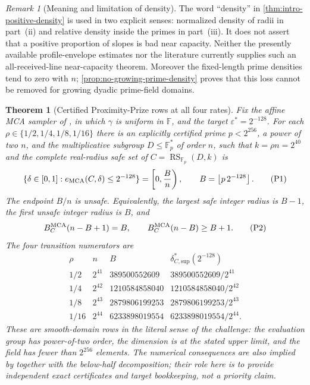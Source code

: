 \documentclass[11pt,a4paper]{amsart}
\numberwithin{equation}{section}
\newtheorem{theorem}{Theorem}[section]
\theoremstyle{remark}
\newtheorem{remark}[remark]{Remark}
\DeclareMathOperator{\RS}{RS}
\newcommand{\F}{\mathbb F}
\newcommand{\eps}{\varepsilon}
\newcommand{\floor}[1]{\left\lfloor #1\right\rfloor}
\begin{document}
\begin{remark}[Meaning and limitation of density]
The word ``density'' in \cref{thm:intro-positive-density} is used in two
explicit senses: normalized density of radii in part~\textup{(ii)} and
relative density inside the primes in part~\textup{(iii)}.  It does not
assert that a positive proportion of slopes is bad near capacity.
Neither the presently available profile-envelope estimates nor the
literature currently supplies such an all-received-line near-capacity
theorem.  Moreover the fixed-length prime densities tend to zero with
\(n\); \cref{prop:no-growing-prime-density} proves that this loss cannot
be removed for growing dyadic prime-field domains.
\end{remark}

\begin{theorem}[Certified Proximity-Prize rows at all four rates]
\label{thm:intro-prize-rows}
Fix the affine MCA sampler of \cite{ABF26}, in which
\(\gamma\) is uniform in \(\F\), and the target
\(\eps^*=2^{-128}\).  For each
\(\rho\in\{1/2,1/4,1/8,1/16\}\) there is an explicitly certified prime
\(p<2^{256}\), a power of two \(n\), and the multiplicative subgroup
\(D\le\F_p^*\) of order \(n\), such that \(k=\rho n=2^{40}\) and the
complete real-radius safe set of
\(C=\RS_{\F_p}(D,k)\) is
\[
 \{\delta\in[0,1]:e_{\rm MCA}(C,\delta)\le2^{-128}\}
       =\left[0,\frac Bn\right),
 \qquad B=\floor{p\,2^{-128}}.
 \tag{P1}\label{eq:intro-prize-safe-set}
\]
The endpoint \(B/n\) is unsafe.  Equivalently, the largest safe integer
radius is \(B-1\), the first unsafe integer radius is \(B\), and
\[
 B_C^{\rm MCA}(n-B+1)=B,
 \qquad B_C^{\rm MCA}(n-B)\ge B+1.
 \tag{P2}\label{eq:intro-prize-adjacent}
\]
The four transition numerators are
\[
\begin{array}{c|c|c|c}
 \rho&n&B&\delta_{C,\mathrm{sup}}^*(2^{-128})\\ \hline
 1/2&2^{41}&389500552609&389500552609/2^{41}\\
 1/4&2^{42}&1210584858040&1210584858040/2^{42}\\
 1/8&2^{43}&2879806199253&2879806199253/2^{43}\\
 1/16&2^{44}&6233898019554&6233898019554/2^{44}.
\end{array}
\tag{P3}\label{eq:intro-prize-table}
\]
These are smooth-domain rows in the literal sense of the challenge: the
evaluation group has power-of-two order, the dimension is at the stated
upper limit, and the field has fewer than \(2^{256}\) elements.
The numerical consequences are also implied by
\cite[Cor.~1.4]{BCHKS25} together with the below-half decomposition;
their role here is to provide
independent exact certificates and target bookkeeping, not a priority
claim.
\end{theorem}
\end{document}
